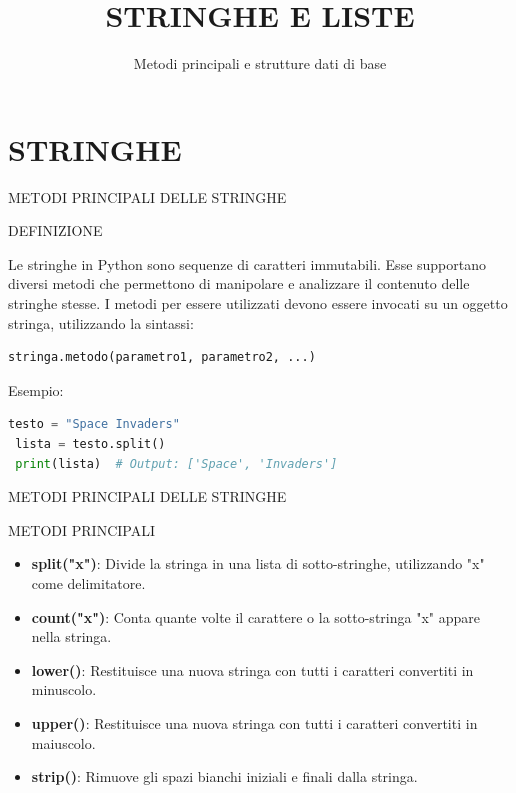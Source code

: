 \documentclass[aspectratio=1610]{beamer}
\title{STRINGHE E LISTE}
\subtitle{Metodi principali e strutture dati di base}
\date{}
\institute{\textit{
        Fonti:
        \begin{itemize}
            \item[-] \href{https://docs.python.org/it/3.15/builtins/stdtypes.html\#string-methods}{Metodi delle Stringhe - Documentazione Ufficiale Python}
            \item[-] \href{https://docs.python.org/it/3.15/tutorial/introduction.html\#lists}{Definizione di Lista - Documentazione Ufficiale Python}
            \item[-] \href{https://docs.python.org/it/3/tutorial/datastructures.html}{Strutture Dati - Documentazione Ufficiale Python} 
        \end{itemize}
    }
}
\begin{document}
\begin{frame}
    \titlepage
\end{frame}

\section{STRINGHE}

\begin{frame}[fragile]{METODI PRINCIPALI DELLE STRINGHE}
    \begin{alertblock}{DEFINIZIONE}
        \begin{minipage}{0.98\linewidth}
            \justifying
            Le stringhe in Python sono sequenze di caratteri immutabili. Esse supportano diversi metodi 
            che permettono di manipolare e analizzare il contenuto delle stringhe stesse. I metodi per essere utilizzati 
            devono essere invocati su un oggetto stringa, utilizzando la sintassi:
\begin{lstlisting}[language=Python]
 stringa.metodo(parametro1, parametro2, ...)
\end{lstlisting}
\pause
Esempio:
\begin{lstlisting}[language=Python]
 testo = "Space Invaders"
 lista = testo.split()
 print(lista)  # Output: ['Space', 'Invaders']
\end{lstlisting}
        \end{minipage}
    \end{alertblock}
\end{frame}

\begin{frame}{METODI PRINCIPALI DELLE STRINGHE}
    \begin{alertblock}{METODI PRINCIPALI}
        \begin{minipage}{0.98\linewidth}
            \justifying
            \begin{itemize}
                \item \textbf{split("x")}: Divide la stringa in una lista di sotto-stringhe, utilizzando "x" come delimitatore.
                \pause
                \item \textbf{count("x")}: Conta quante volte il carattere o la sotto-stringa "x" appare nella stringa. 
                \pause
                \item \textbf{lower()}: Restituisce una nuova stringa con tutti i caratteri convertiti in minuscolo.
                \pause
                \item \textbf{upper()}: Restituisce una nuova stringa con tutti i caratteri convertiti in maiuscolo.
                \pause
                \item \textbf{strip()}: Rimuove gli spazi bianchi iniziali e finali dalla stringa.
            \end{itemize}
        \end{minipage}
    \end{alertblock}
\end{frame}
\end{document}
